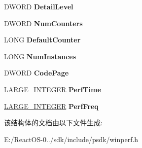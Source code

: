 \begin{DoxyCompactItemize}
\item 
\mbox{\label{struct___p_e_r_f___o_b_j_e_c_t___t_y_p_e_ae351f1e43d570f5e33d248e4e0692c2b}} 
D\+W\+O\+RD {\bfseries Detail\+Level}
\item 
\mbox{\label{struct___p_e_r_f___o_b_j_e_c_t___t_y_p_e_a14511444ad1f3727f1365229cbdf9949}} 
D\+W\+O\+RD {\bfseries Num\+Counters}
\item 
\mbox{\label{struct___p_e_r_f___o_b_j_e_c_t___t_y_p_e_a99f0ffd3f4fa4bc2aece6348e759ba37}} 
L\+O\+NG {\bfseries Default\+Counter}
\item 
\mbox{\label{struct___p_e_r_f___o_b_j_e_c_t___t_y_p_e_a483493c5803b50eccb41be9dac1d49bb}} 
L\+O\+NG {\bfseries Num\+Instances}
\item 
\mbox{\label{struct___p_e_r_f___o_b_j_e_c_t___t_y_p_e_a7c0e791f616597faece730e3f0f613f0}} 
D\+W\+O\+RD {\bfseries Code\+Page}
\item 
\mbox{\label{struct___p_e_r_f___o_b_j_e_c_t___t_y_p_e_a24b1554ce3a68c33d91445e93e67da3b}} 
\hyperlink{union___l_a_r_g_e___i_n_t_e_g_e_r}{L\+A\+R\+G\+E\+\_\+\+I\+N\+T\+E\+G\+ER} {\bfseries Perf\+Time}
\item 
\mbox{\label{struct___p_e_r_f___o_b_j_e_c_t___t_y_p_e_ac80f24cffd693570d99e29bad9cdfc13}} 
\hyperlink{union___l_a_r_g_e___i_n_t_e_g_e_r}{L\+A\+R\+G\+E\+\_\+\+I\+N\+T\+E\+G\+ER} {\bfseries Perf\+Freq}
\end{DoxyCompactItemize}


该结构体的文档由以下文件生成\+:\begin{DoxyCompactItemize}
\item 
E\+:/\+React\+O\+S-\/0../sdk/include/psdk/winperf.\+h\end{DoxyCompactItemize}
